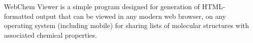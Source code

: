 WebChem Viewer is a simple program designed for generation of HTML-formatted output that can be viewed in any modern web browser, on any operating system (including mobile) for sharing lists of molecular structures with associated chemical properties. 